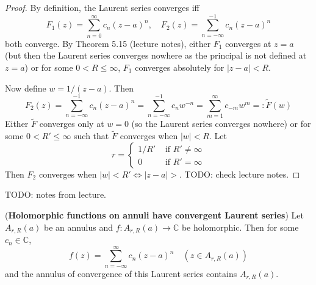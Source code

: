 \begin{proof}
	By definition, the Laurent series converges iff
	\[
		F_1(z) = \sum_{n = 0}^{\infty} c_n {(z - a)}^n, \quad F_2(z) = \sum_{n = -\infty}^{-1} c_n {(z - a)}^n
	\]
	both converge. By Theorem 5.15 (lecture notes), either $F_1$ converges at $z = a$ (but then the Laurent series converges nowhere as the principal is not defined at $z = a$) or for some $0 < R \le \infty$, $F_1$ converges absolutely for $|z - a| < R$.

	Now define $w = 1 / (z - a)$. Then
	\[
		F_2(z) = \sum_{n = -\infty}^{-1} c_n (z - a)^n = \sum_{n = -\infty}^{-1} c_n w^{-n} = \sum_{m = 1}^{\infty} c_{-m} w^m =: \tilde{F}(w)
	\]
	Either $\tilde{F}$ converges only at $w = 0$ (so the Laurent series converges nowhere) or for some $0 < R' \le \infty$ such that $\tilde{F}$ converges when $|w| < R$. Let
	\[
		r = \begin{cases}
			1 / R' & \text{ if } R' \ne \infty \\
			0 & \text{ if } R' = \infty
		\end{cases}
	\]
	Then $F_2$ converges when $|w| < R' \Longleftrightarrow |z - a| > $. TODO: check lecture notes. 
\end{proof}

TODO: notes from lecture.

\begin{theorem}
	(\textbf{Holomorphic functions on annuli have convergent Laurent series}) Let $A_{r, R}(a)$ be an annulus and $f: A_{r, R}(a) \rightarrow \mathbb{C}$ be holomorphic. Then for some $c_n \in \mathbb{C}$,
	\[
		f(z) = \sum_{n = -\infty}^{\infty} c_n {(z - a)}^n \quad (z \in A_{r, R}(a))
	\]
	and the annulus of convergence of this Laurent series contains $A_{r, R}(a)$.
\end{theorem}

